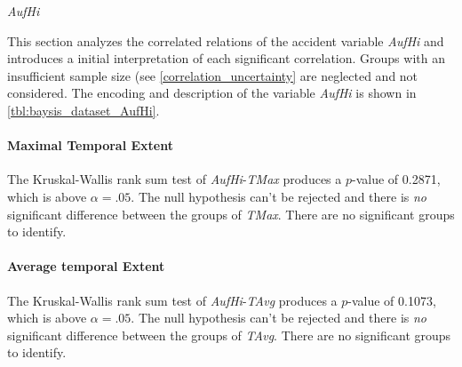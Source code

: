 \Large
\centerline{\textit{AufHi}}
\normalsize
This section analyzes the correlated relations of the accident variable \textit{AufHi} and introduces a initial interpretation of each significant correlation. Groups with an insufficient sample size (see \cref{correlation_uncertainty} are neglected and not considered. The encoding and description of the variable \textit{AufHi} is shown in \cref{tbl:baysis_dataset_AufHi}.

\paragraph{Maximal Temporal Extent}
The Kruskal-Wallis rank sum test of \textit{AufHi}-\textit{TMax} produces a $p$-value of 0.2871, which is above $\alpha=.05$. The null hypothesis can't be rejected and there is \textit{no} significant difference between the groups of \textit{TMax}. There are no significant groups to identify.

\paragraph{Average temporal Extent}
The Kruskal-Wallis rank sum test of \textit{AufHi}-\textit{TAvg} produces a $p$-value of 0.1073, which is above $\alpha=.05$. The null hypothesis can't be rejected and there is \textit{no} significant difference between the groups of \textit{TAvg}. There are no significant groups to identify.


